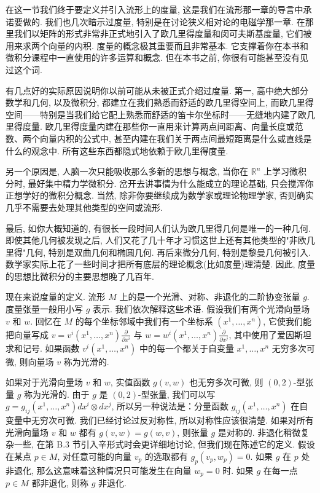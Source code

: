 在这一节我们终于要定义并引入流形上的度量, 这是我们在流形那一章的导言中承诺要做的. 我们也几次暗示过度量, 特别是在讨论狭义相对论的电磁学那一章. 在那里我们以矩阵的形式非常非正式地引入了欧几里得度量和闵可夫斯基度量, 它们被用来求两个向量的内积. 度量的概念极其重要而且非常基本. 它支撑着你在本书和微积分课程中一直使用的许多运算和概念. 但在本书之前, 你很有可能甚至没有见过这个词.

有几点好的实际原因说明你以前可能从未被正式介绍过度量. 第一, 高中绝大部分数学和几何, 以及微积分, 都建立在我们熟悉而舒适的欧几里得空间上, 而欧几里得空间——特别是当我们给它配上熟悉而舒适的笛卡尔坐标时——无缝地内建了欧几里得度量. 欧几里得度量内建在那些你一直用来计算两点间距离、向量长度或范数、两个向量内积的公式中, 甚至内建在我们关于两点间最短距离是什么或直线是什么的观念中. 所有这些东西都隐式地依赖于欧几里得度量.

另一个原因是, 人脑一次只能吸收那么多新的思想与概念, 当你在 $\mathbb{R}^n$ 上学习微积分时, 最好集中精力学微积分. 岔开去讲事情为什么能成立的理论基础, 只会搅浑你正想学好的微积分概念. 当然, 除非你要继续成为数学家或理论物理学家, 否则确实几乎不需要去处理其他类型的空间或流形.

最后, 如你大概知道的, 有很长一段时间人们认为欧几里得几何是唯一的一种几何. 即使其他几何被发现之后, 人们又花了几十年才习惯这世上还有其他类型的"非欧几里得"几何, 特别是双曲几何和椭圆几何. 再后来微分几何, 特别是黎曼几何被引入. 数学家实际上花了一些时间才把所有底层的理论概念(比如度量)理清楚. 因此, 度量的思想比微积分的主要思想晚了几百年.

现在来说度量的定义. 流形 $M$ 上的是一个光滑、对称、非退化的二阶协变张量 $g$. 度量张量一般用小写 $g$ 表示. 我们依次解释这些术语. 假设我们有两个光滑向量场 $v$ 和 $w$. 回忆在 $M$ 的每个坐标邻域中我们有一个坐标系 $(x^1,\ldots,x^n)$, 它使我们能把向量写成 $v=v^i(x^1,\ldots,x^n)\frac{\partial}{\partial x^i}$ 与 $w=w^i(x^1,\ldots,x^n)\frac{\partial}{\partial x^j}$, 其中使用了爱因斯坦求和记号. 如果函数 $v^i(x^1,\ldots,x^n)$ 中的每一个都关于自变量 $x^1,\ldots,x^n$ 无穷多次可微, 则向量场 $v$ 称为光滑的.

如果对于光滑向量场 $v$ 和 $w$, 实值函数 $g(v,w)$ 也无穷多次可微, 则 $(0,2)$-型张量 $g$ 称为光滑的. 由于 $g$ 是 $(0,2)$-型张量, 我们可以写 $g=g_{ij}(x^1,\ldots,x^n)dx^i\otimes dx^j$, 所以另一种说法是：分量函数 $g_{ij}(x^1,\ldots,x^n)$ 在自变量中无穷次可微. 我们已经讨论过反对称性, 所以对称性应该很清楚. 如果对所有光滑向量场 $v$ 和 $w$ 都有 $g(v,w)=g(w,v)$, 则张量 $g$ 是对称的. 非退化稍微复杂一些, 在第 B.3 节引入辛形式时会更详细地讨论, 但我们现在陈述它的定义. 假设在某点 $p\in M$, 对任意可能的向量 $v_p$ 的选取都有 $g_p(v_p,w_p)=0$. 如果 $g$ 在 $p$ 处非退化, 那么这意味着这种情况只可能发生在向量 $w_p=0$ 时. 如果 $g$ 在每一点 $p\in M$ 都非退化, 则称 $g$ 非退化.

